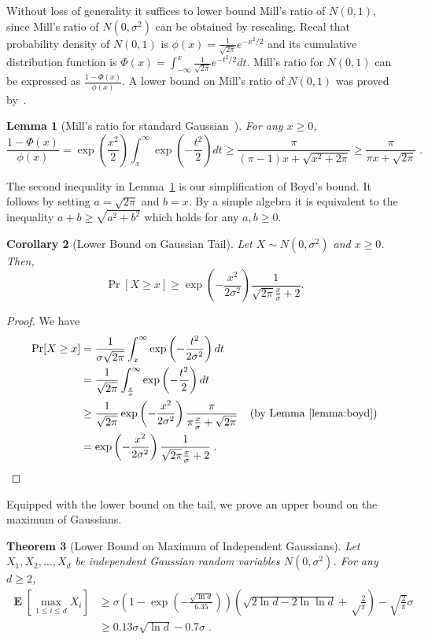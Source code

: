\documentclass{article}
\DeclareMathOperator*{\Exp}{\mathbf{E}}
\newtheorem{theorem}{Theorem}
\newtheorem{lemma}[theorem]{Lemma}
\newtheorem{corollary}[theorem]{Corollary}
\begin{document}
Without loss of generality it suffices to lower bound Mill's ratio of $N(0,1)$,
since Mill's ratio of $N(0,\sigma^2)$ can be obtained by rescaling.  Recal that
probability density of $N(0,1)$ is $\phi(x) = \frac{1}{\sqrt{2 \pi}}
e^{-x^2/2}$ and its cumulative distribution function is $\Phi(x) =
\int_{-\infty}^x \frac{1}{\sqrt{2 \pi}} e^{-t^2/2} dt$.  Mill's ratio for
$N(0,1)$ can be expressed as $\frac{1 - \Phi(x)}{\phi(x)}$. A lower bound on
Mill's ratio of $N(0,1)$ was proved by~\cite{Boyd-1959}.

\begin{lemma}[Mill's ratio for standard Gaussian~\citep{Boyd-1959}]
\label{lemma:boyd}
For any $x \ge 0$,
$$
\frac{1 - \Phi(x)}{\phi(x)}
= \exp\left(\frac{x^2}{2}\right) \int_x^{\infty} \exp\left(-\frac{t^2}{2}\right) dt
\ge \frac{\pi}{(\pi-1)x+\sqrt{x^2+2 \pi}}
\ge \frac{\pi}{\pi x + \sqrt{2\pi}} \; .
$$
\end{lemma}
The second inequality in Lemma~\ref{lemma:boyd} is our simplification of Boyd's
bound.  It follows by setting $a=\sqrt{2 \pi}$ and $b=x$. By a simple algebra
it is equivalent to the inequality $a + b \ge \sqrt{a^2 + b^2}$ which holds for
any $a,b \ge 0$.

\begin{corollary}[Lower Bound on Gaussian Tail]
Let $X \sim N(0, \sigma^2)$ and $x \ge 0$. Then,
$$
\Pr[X \ge x] \ge \exp\left(-\frac{x^2}{2 \sigma^2}\right) \frac{1}{\sqrt{2\pi}\frac{x}{\sigma}+2}.
$$
\end{corollary}

\begin{proof}
We have
\begin{align*}
\Pr[X \ge x]
& = \frac{1}{\sigma \sqrt{2 \pi}} \int_x^{\infty} \exp \left( -\frac{t^2}{2 \sigma^2} \right) d t \\
& = \frac{1}{\sqrt{2 \pi}} \int_\frac{x}{\sigma}^{\infty} \exp \left( -\frac{t^2}{2} \right) d t \\
& \ge \frac{1}{\sqrt{2 \pi}} \exp\left(-\frac{x^2}{2 \sigma^2}\right) \frac{\pi}{\pi\frac{x}{\sigma}+\sqrt{2 \pi}} & \text{(by Lemma~\ref{lemma:boyd})} \\
& = \exp\left(-\frac{x^2}{2 \sigma^2}\right) \frac{1}{\sqrt{2\pi}\frac{x}{\sigma}+2} \; . \qquad \qedhere
\end{align*}
\end{proof}

Equipped with the lower bound on the tail, we prove an upper bound on the maximum of Gaussians.

\begin{theorem}[Lower Bound on Maximum of Independent Gaussians]
Let $X_1, X_2, \dots, X_d$ be independent Gaussian random variables $N(0,\sigma^2)$. For any $d \ge 2$,
\begin{align}
\Exp \left[\max_{1 \le i \le d} X_i\right]
& \ge \sigma \left(1 - \exp\left(-\frac{\sqrt{\ln d}}{6.35}\right)\right) \left(\sqrt{2 \ln d - 2 \ln \ln d} +\sqrt\frac{2}{\pi}\right) -\sqrt{\frac{2}{\pi}} \sigma \label{equation:maximum-of-gaussians-lower-bound-1} \\
& \ge 0.13 \sigma \sqrt{\ln d} - 0.7 \sigma \label{equation:maximum-of-gaussians-lower-bound-2} \; .
\end{align}
\end{theorem}
\end{document}

